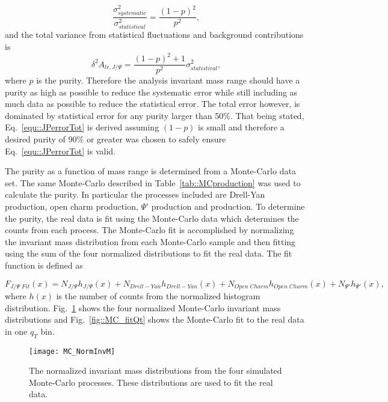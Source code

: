\begin{equation}
  \frac{\sigma^2_{systematic}}{\sigma^2_{statistical}} = \frac{(1-p)^2}{p^2},
\end{equation}
\noindent
and the total variance from statistical fluctuations and background
contributions is
\begin{equation}
  \delta^2 A_{lr,J/\Psi} = \frac{(1-p)^2 + 1}{p^2}\sigma^2_{statistical},
  \label{equ::JPerrorTot}
\end{equation}
where $p$ is the {\jp} purity.  Therefore the analysis invariant mass range
should have a {\jp} purity as high as possible to reduce the systematic error
while still including as much data as possible to reduce the statistical error.
The total error however, is dominated by statistical error for any purity larger
than 50\%.  That being stated, Eq.~\ref{equ::JPerrorTot} is derived assuming
$(1-p)$ is small and therefore a desired purity of 90\% or greater was chosen to
safely ensure Eq.~\ref{equ::JPerrorTot} is valid.

The {\jp} purity as a function of mass range is determined from a Monte-Carlo
data set.  The same Monte-Carlo described in Table~\ref{tab::MCproduction} was
used to calculate the {\jp} purity.  In particular the processes included are
Drell-Yan production, open charm production, $\Psi$' production and {\jp}
production.  To determine the purity, the real data is fit using the Monte-Carlo
data which determines the counts from each process.  The Monte-Carlo fit is
accomplished by normalizing the invariant mass distribution from each
Monte-Carlo sample and then fitting using the sum of the four normalized
distributions to fit the real data.  The fit function is defined as

\begin{equation}
  F_{J/\Psi \;Fit}(x) = N_{J/\Psi}h_{J/\Psi}(x) + N_{Drell-Yan}h_{Drell-Yan}(x)
  + N_{Open\;Charm}h_{Open\;Charm}(x)+N_{\Psi'}h_{\Psi'}(x),
\end{equation}
\noindent
where $h(x)$ is the number of counts from the normalized histogram distribution.
Fig.~\ref{fig::MC_NormInvM} shows the four normalized Monte-Carlo invariant mass
distributions and Fig.~\ref{fig::MC_fitQt} shows the Monte-Carlo fit to the real
data in one $q_T$ bin.

\begin{figure}[h!t]
  \centering
  \texttt{[image: MC\_NormInvM]}
  \caption{The normalized invariant mass distributions from the four simulated
    Monte-Carlo processes.  These distributions are used to fit the real data.}
  \label{fig::MC_NormInvM}
\end{figure}

